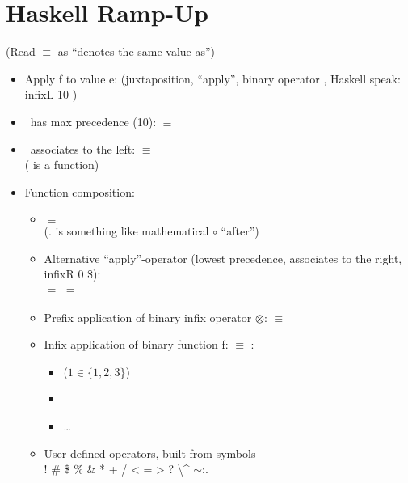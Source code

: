 

\chapter{Haskell Ramp-Up} %
\label{cha:haskell_ramp_up}

(Read $\equiv$ as ``denotes the same value as'')

\begin{itemize}
    \item Apply f to value e:  (juxtaposition, ``apply'', binary operator \textvisiblespace, Haskell speak: infixL 10 \textvisiblespace)
    \item \textvisiblespace\ has max precedence (10):  $\equiv$ 
    \item \textvisiblespace\ associates to the left:  $\equiv$  \\ ( is a function) \item Function composition: \begin{itemize}
        \item {} $\equiv$  \\ (. is something like mathematical $\circ$ ``after'')
        \item Alternative ``apply''-operator \codeline{\$} (lowest precedence, associates to the right, infixR 0 \$):\\
             $\equiv$  $\equiv$ 
        \item Prefix application of binary infix operator $\otimes$:  $\equiv$  
        \item Infix application of binary function f:  $\equiv$ :
        \begin{itemize}
            \item {}   ($1 \in \{1,2,3\}$)
            \item {}
            \item \dots
        \end{itemize}
        \item User defined operators, built from symbols \\ ! \# \$ \% \& * + / < = > ? \@ \textbackslash \string^ \textbar $\sim$:.
    \end{itemize}
\end{itemize} 



